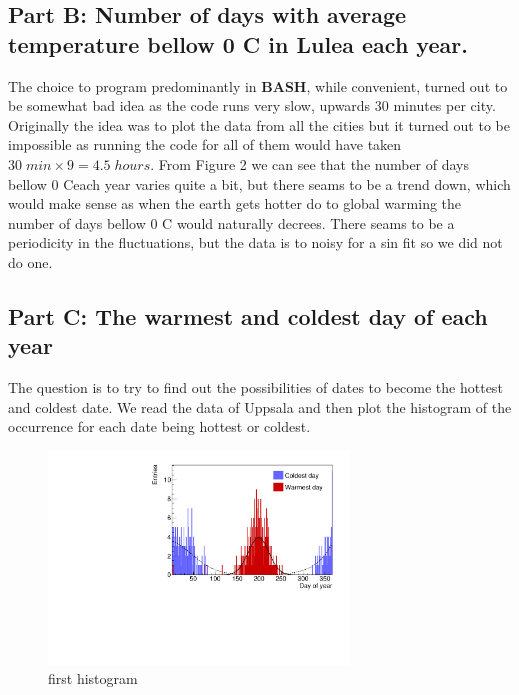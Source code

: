 \documentclass[a4paper]{article}
\begin{document}
\subsection{Part B: Number of days with average temperature bellow 0 C \degree in Lulea each
year.}
The choice to program predominantly in \textbf{BASH}, while convenient, turned out to be somewhat bad idea as the code runs very slow, upwards 30 minutes per city. Originally the idea was to plot the data from all the cities but it turned out to be impossible as running the code for all of them would have taken $30\; min \times 9=4.5\; hours$.
\newline
\newline
From Figure 2 we can see that the number of days bellow 0 C\degree each year varies quite a bit, but there seams to be a trend down, which would make sense as when the earth gets hotter do to global warming the number of days bellow 0 C \degree would naturally decrees. There seams to be a periodicity in the fluctuations, but the data is to noisy for a sin fit so we did not do one.
\subsection{Part C: The warmest and coldest day of each year}

The question is to try to find out the possibilities of dates to become the hottest and coldest date. We read the data of Uppsala and then plot the histogram of the occurrence for each date being hottest or coldest. 

\begin{figure}[htp]
    \centering
    \includegraphics[width=8cm]{./images/hotCold_Upp_prev}
    \caption{first histogram}
    \label{fig:hist}
\end{figure}
\end{document}
